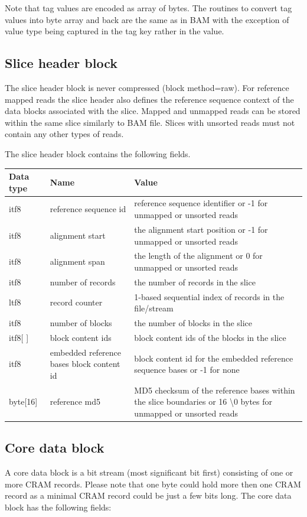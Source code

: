 \documentclass[a4paper]{article}
\begin{document}
Note that tag values are encoded as array of bytes. The routines to convert tag 
values into byte array and back are the same as in BAM with the exception of value 
type being captured in the tag key rather in the value. 

\subsection{\textbf{Slice header block}}

The slice header block is never compressed (block method=raw). For reference mapped 
reads the slice header also defines the reference sequence context of the data 
blocks associated with the slice. Mapped and unmapped reads can be stored within 
the same slice similarly to BAM file. Slices with unsorted reads must not contain 
any other types of reads.

The slice header block contains the following fields.

\begin{tabular}{|l|l|>{\raggedright}p{200pt}|}
\hline
\textbf{Data type} & \textbf{Name} & \textbf{Value}\tabularnewline
\hline
itf8 & reference sequence id & reference sequence identifier or -1 for unmapped 
or unsorted reads\tabularnewline
\hline
itf8 & alignment start & the alignment start position or -1 for unmapped or unsorted 
reads\tabularnewline
\hline
itf8 & alignment span & the length of the alignment or 0 for unmapped or unsorted 
reads\tabularnewline
\hline
itf8 & number of records & the number of records in the slice\tabularnewline
\hline
ltf8 & record counter & 1-based sequential index of records in the file/stream\tabularnewline
\hline
itf8 & number of blocks & the number of blocks in the slice\tabularnewline
\hline
itf8[ ] & block content ids & block content ids of the blocks in the slice\tabularnewline
\hline
itf8 & embedded reference bases block content id & block content id for the embedded 
reference sequence bases or -1 for none\tabularnewline
\hline
byte[16] & reference md5 & MD5 checksum of the reference bases within the slice 
boundaries or 16 \textbackslash{}0 bytes for unmapped or unsorted reads\tabularnewline
\hline
\end{tabular}

\subsection{\textbf{Core data block}}

A core data block is a bit stream (most significant bit first) consisting of one 
or more CRAM records. Please note that one byte could hold more then one CRAM record 
as a minimal CRAM record could be just a few bits long. The core data block has 
the following fields:
\end{document}
